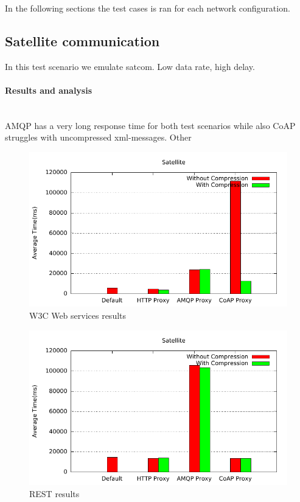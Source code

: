 In the following sections the test cases is ran for each network
configuration.


\subsection{Satellite communication}

In this test scenario we emulate \gls{satcom}. Low data rate, high delay.

\paragraph{Results and analysis}\mbox{}\\

AMQP has a very long response time for both test scenarios while also CoAP
struggles with uncompressed xml-messages. Other 

\begin{figure}[H]
\center
\includegraphics[scale=0.75]{../results/satellite/nffi/out.pdf}
\caption{W3C Web services results}
\end{figure}

\begin{figure}[H]
\center
\includegraphics[scale=0.75]{../results/satellite/rest/out.pdf}
\caption{REST results}
\end{figure}

